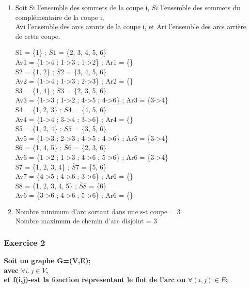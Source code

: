 \documentclass[]{article}
\begin{document}
\begin{enumerate}
\item Soit Si l'ensemble des sommets de la coupe i, $\overline Si$ l'ensemble des sommets du complémentaire de la coupe i, \\
Avi l'ensemble des arcs avants de la coupe i, et Ari l'ensemble des arcs arrière de cette coupe.\\
\begin{center}
S1 = \{1\} ; $\overline S1$ = \{2, 3, 4, 5, 6\}\\ 
Av1 = \{1->4 ; 1->3 ; 1->2\} ; Ar1 = \{\}\\
S2 = \{1, 2\} ; $\overline S2$ = \{3, 4, 5, 6\}\\
Av2 = \{1->4 ; 1->3 ; 2->3\} ; Ar2 = \{\}\\ 
S3 = \{1, 4\} ; $\overline S3$ = \{2, 3, 5, 6\}\\
Av3 = \{1->3 ; 1->2 ; 4->5 ; 4->6\} ; Ar3 = \{3->4\}\\
S4 = \{1, 2, 3\} ; $\overline S4$ = \{4, 5, 6\}\\ 
Av4 = \{1->4 ; 3->4 ; 3->6\} ; Ar4 = \{\}\\
S5 = \{1, 2, 4\} ; $\overline S5$ = \{3, 5, 6\}\\
Av5 = \{1->3 ; 2->3 ; 4->5 ; 4->6\} ; Ar5 = \{3->4\}\\
S6 = \{1, 4, 5\} ; $\overline S6$ = \{2, 3, 6\}\\
Av6 = \{1->2 ; 1->3 ; 4->6 ; 5->6\} ; Ar6 = \{3->4\}\\ 
S7 = \{1, 2, 3, 4\} ; $\overline S7$ = \{5, 6\}\\ 
Av7 = \{4->5 ; 4->6 ; 3->6\} ; Ar6 = \{\}\\ 
S8 = \{1, 2, 3, 4, 5\} ; $\overline S8$ = \{6\}\\
Av6 = \{3->6 ; 4->6 ; 5->6\} ; Ar6 = \{\}\\
\end{center}


\item Nombre minimum d'arc sortant dans une s-t coupe = 3\\
  Nombre maximum de chemin d'arc disjoint = 3\\

\end{enumerate}

\subsubsection{Exercice 2}

\textbf{Soit un graphe G=(V,E);\\avec $\forall i,j \in V$,\\
et f(i,j)-est la fonction representant le flot de l'arc ou $\forall (i,j)\in E$;\\}
\end{document}
